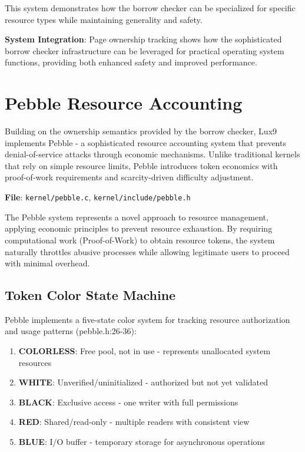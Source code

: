 \documentclass[11pt,letterpaper]{article}
\begin{document}
This system demonstrates how the borrow checker can be specialized for specific resource types while maintaining generality and safety.

\textbf{System Integration}: Page ownership tracking shows how the sophisticated borrow checker infrastructure can be leveraged for practical operating system functions, providing both enhanced safety and improved performance.

\section{Pebble Resource Accounting}

Building on the ownership semantics provided by the borrow checker, Lux9 implements Pebble - a sophisticated resource accounting system that prevents denial-of-service attacks through economic mechanisms. Unlike traditional kernels that rely on simple resource limits, Pebble introduces token economics with proof-of-work requirements and scarcity-driven difficulty adjustment.

\textbf{File}: \texttt{kernel/pebble.c}, \texttt{kernel/include/pebble.h}

The Pebble system represents a novel approach to resource management, applying economic principles to prevent resource exhaustion. By requiring computational work (Proof-of-Work) to obtain resource tokens, the system naturally throttles abusive processes while allowing legitimate users to proceed with minimal overhead.

\subsection{Token Color State Machine}

Pebble implements a five-state color system for tracking resource authorization and usage patterns (pebble.h:26-36):

\begin{enumerate}
\item \textbf{COLORLESS}: Free pool, not in use - represents unallocated system resources
\item \textbf{WHITE}: Unverified/uninitialized - authorized but not yet validated
\item \textbf{BLACK}: Exclusive access - one writer with full permissions
\item \textbf{RED}: Shared/read-only - multiple readers with consistent view
\item \textbf{BLUE}: I/O buffer - temporary storage for asynchronous operations
\end{enumerate}
\end{document}
